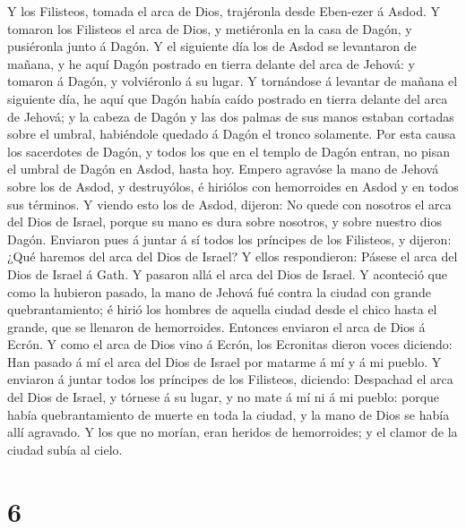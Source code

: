  Y los Filisteos, tomada el arca de Dios, trajéronla desde
Eben-ezer á Asdod.  Y tomaron los Filisteos el arca de
Dios, y metiéronla en la casa de Dagón, y pusiéronla junto á Dagón.
 Y el siguiente día los de Asdod se levantaron de mañana,
y he aquí Dagón postrado en tierra delante del arca de Jehová: y tomaron
á Dagón, y volviéronlo á su lugar.  Y tornándose á
levantar de mañana el siguiente día, he aquí que Dagón había caído
postrado en tierra delante del arca de Jehová; y la cabeza de Dagón y
las dos palmas de sus manos estaban cortadas sobre el umbral, habiéndole
quedado á Dagón el tronco solamente.  Por esta causa los
sacerdotes de Dagón, y todos los que en el templo de Dagón entran, no
pisan el umbral de Dagón en Asdod, hasta hoy.  Empero
agravóse la mano de Jehová sobre los de Asdod, y destruyólos, é hiriólos
con hemorroides en Asdod y en todos sus términos.  Y
viendo esto los de Asdod, dijeron: No quede con nosotros el arca del
Dios de Israel, porque su mano es dura sobre nosotros, y sobre nuestro
dios Dagón.  Enviaron pues á juntar á sí todos los
príncipes de los Filisteos, y dijeron: ¿Qué haremos del arca del Dios de
Israel? Y ellos respondieron: Pásese el arca del Dios de Israel á Gath.
Y pasaron allá el arca del Dios de Israel.  Y aconteció
que como la hubieron pasado, la mano de Jehová fué contra la ciudad con
grande quebrantamiento; é hirió los hombres de aquella ciudad desde el
chico hasta el grande, que se llenaron de hemorroides. 
Entonces enviaron el arca de Dios á Ecrón. Y como el arca de Dios vino á
Ecrón, los Ecronitas dieron voces diciendo: Han pasado á mí el arca del
Dios de Israel por matarme á mí y á mi pueblo.  Y
enviaron á juntar todos los príncipes de los Filisteos, diciendo:
Despachad el arca del Dios de Israel, y tórnese á su lugar, y no mate á
mí ni á mi pueblo: porque había quebrantamiento de muerte en toda la
ciudad, y la mano de Dios se había allí agravado.  Y los
que no morían, eran heridos de hemorroides; y el clamor de la ciudad
subía al cielo.

\hypertarget{section-5}{%
\section{6}\label{section-5}}

